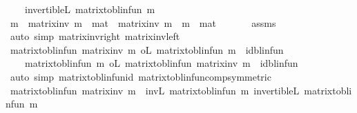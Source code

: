 \begin{isabellebody}
\ \ \ \ {\isachardoublequoteopen}invertible\isactrlsub L\ {\isacharparenleft}{\kern0pt}matrix{\isacharunderscore}{\kern0pt}to{\isacharunderscore}{\kern0pt}blinfun\ m{\isacharparenright}{\kern0pt}{\isachardoublequoteclose}\isanewline
%
\isadelimproof
%
\endisadelimproof
%
\isatagproof
{}\isamarkupfalse%
\ {\isacharminus}{\kern0pt}\isanewline
\ \ \isamarkupfalse%
\ {\isachardoublequoteopen}m\ {\isacharasterisk}{\kern0pt}{\isacharasterisk}{\kern0pt}\ matrix{\isacharunderscore}{\kern0pt}inv\ m\ {\isacharequal}{\kern0pt}\ mat\ {}{\isachardoublequoteclose}\ {\isachardoublequoteopen}matrix{\isacharunderscore}{\kern0pt}inv\ m\ {\isacharasterisk}{\kern0pt}{\isacharasterisk}{\kern0pt}\ m\ {\isacharequal}{\kern0pt}\ mat\ {}{\isachardoublequoteclose}\isanewline
\ \ \ \ \isamarkupfalse%
\ assms\ \isanewline
\ \ \ \ \isamarkupfalse%
\ {\isacharparenleft}{\kern0pt}auto\ simp{\isacharcolon}{\kern0pt}\ matrix{\isacharunderscore}{\kern0pt}inv{\isacharunderscore}{\kern0pt}right\ matrix{\isacharunderscore}{\kern0pt}inv{\isacharunderscore}{\kern0pt}left{\isacharparenright}{\kern0pt}\isanewline
\ \ \isamarkupfalse%
\ {\isachardoublequoteopen}matrix{\isacharunderscore}{\kern0pt}to{\isacharunderscore}{\kern0pt}blinfun\ {\isacharparenleft}{\kern0pt}matrix{\isacharunderscore}{\kern0pt}inv\ m{\isacharparenright}{\kern0pt}\ o\isactrlsub L\ matrix{\isacharunderscore}{\kern0pt}to{\isacharunderscore}{\kern0pt}blinfun\ m\ {\isacharequal}{\kern0pt}\ id{\isacharunderscore}{\kern0pt}blinfun{\isachardoublequoteclose}\ \isanewline
\ \ \ \ {\isachardoublequoteopen}matrix{\isacharunderscore}{\kern0pt}to{\isacharunderscore}{\kern0pt}blinfun\ m\ o\isactrlsub L\ matrix{\isacharunderscore}{\kern0pt}to{\isacharunderscore}{\kern0pt}blinfun\ {\isacharparenleft}{\kern0pt}matrix{\isacharunderscore}{\kern0pt}inv\ m{\isacharparenright}{\kern0pt}\ {\isacharequal}{\kern0pt}\ id{\isacharunderscore}{\kern0pt}blinfun{\isachardoublequoteclose}\isanewline
\ \ \ \ \isamarkupfalse%
\ {\isacharparenleft}{\kern0pt}auto\ simp{\isacharcolon}{\kern0pt}\ matrix{\isacharunderscore}{\kern0pt}to{\isacharunderscore}{\kern0pt}blinfun{\isacharunderscore}{\kern0pt}id\ matrix{\isacharunderscore}{\kern0pt}to{\isacharunderscore}{\kern0pt}blinfun{\isacharunderscore}{\kern0pt}comp{\isacharbrackleft}{\kern0pt}symmetric{\isacharbrackright}{\kern0pt}{\isacharparenright}{\kern0pt}\isanewline
\ \ \isamarkupfalse%
\ {\isachardoublequoteopen}matrix{\isacharunderscore}{\kern0pt}to{\isacharunderscore}{\kern0pt}blinfun\ {\isacharparenleft}{\kern0pt}matrix{\isacharunderscore}{\kern0pt}inv\ m{\isacharparenright}{\kern0pt}\ {\isacharequal}{\kern0pt}\ inv\isactrlsub L\ {\isacharparenleft}{\kern0pt}matrix{\isacharunderscore}{\kern0pt}to{\isacharunderscore}{\kern0pt}blinfun\ m{\isacharparenright}{\kern0pt}{\isachardoublequoteclose}\ {\isachardoublequoteopen}invertible\isactrlsub L\ {\isacharparenleft}{\kern0pt}matrix{\isacharunderscore}{\kern0pt}to{\isacharunderscore}{\kern0pt}blinfun\ m{\isacharparenright}{\kern0pt}{\isachardoublequoteclose}\isanewline

\end{isabellebody}
